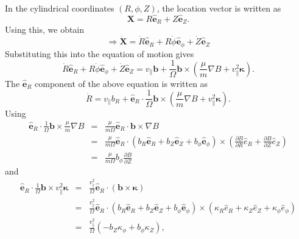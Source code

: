 \documentclass{article}
\begin{document}
In the cylindrical coordinates $(R, \phi, Z)$, the location vector is written
as
\begin{equation}
  \mathbf{X}= R \hat{\mathbf{e}}_R + Z \hat{\mathbf{e}}_Z .
\end{equation}
Using this, we obtain
\begin{equation}
  \Rightarrow \dot{\mathbf{X}} = \dot{R} \hat{\mathbf{e}}_R + R \dot{\phi}
  \hat{\mathbf{e}}_{\phi} + \dot{Z} \hat{\mathbf{e}}_Z
\end{equation}
Substituting this into the equation of motion gives
\begin{equation}
  \label{11-17-2} \dot{R} \hat{\mathbf{e}}_R + R \dot{\phi}
  \hat{\mathbf{e}}_{\phi} + \dot{Z} \hat{\mathbf{e}}_Z = v_{\parallel}
  \mathbf{b}+ \frac{1}{\Omega} \mathbf{b} \times \left( \frac{\mu}{m} \nabla B
  + v_{\parallel}^2 \mathbf{\kappa} \right) .
\end{equation}
The $\hat{\mathbf{e}}_R$ component of the above equation is written as
\begin{equation}
  \label{11-17-1} \dot{R} = v_{\parallel} b_R + \hat{\mathbf{e}}_R \cdot
  \frac{1}{\Omega} \mathbf{b} \times \left( \frac{\mu}{m} \nabla B +
  v_{\parallel}^2 \mathbf{\kappa} \right) .
\end{equation}
Using
\begin{eqnarray}
  \hat{\mathbf{e}}_R \cdot \frac{1}{\Omega} \mathbf{b} \times \frac{\mu}{m}
  \nabla B & = & \frac{\mu}{m \Omega} \hat{\mathbf{e}}_R \cdot \mathbf{b}
  \times \nabla B \nonumber\\
  & = & \frac{\mu}{m \Omega} \hat{\mathbf{e}}_R \cdot (b_R \hat{\mathbf{e}}_R
  + b_Z \hat{\mathbf{e}}_Z + b_{\phi} \hat{\mathbf{e}}_{\phi}) \times \left(
  \frac{\partial B}{\partial R} \hat{e}_R + \frac{\partial B}{\partial Z}
  \hat{e}_Z \right) \nonumber\\
  & = & \frac{\mu}{m \Omega} b_{\phi}  \frac{\partial B}{\partial Z} 
\end{eqnarray}
and
\begin{eqnarray}
  \hat{\mathbf{e}}_R \cdot \frac{1}{\Omega} \mathbf{b} \times v_{\parallel}^2
  \mathbf{\kappa} & = & \frac{v_{\parallel}^2}{\Omega} \hat{\mathbf{e}}_R
  \cdot (\mathbf{b} \times \mathbf{\kappa}) \nonumber\\
  & = & \frac{v_{\parallel}^2}{\Omega} \hat{\mathbf{e}}_R \cdot (b_R
  \hat{\mathbf{e}}_R + b_Z \hat{\mathbf{e}}_Z + b_{\phi}
  \hat{\mathbf{e}}_{\phi}) \times (\kappa_R \hat{e}_R + \kappa_Z \hat{e}_Z +
  \kappa_{\phi} \hat{e}_{\phi}) \nonumber\\
  & = & \frac{v_{\parallel}^2}{\Omega} (- b_Z \kappa_{\phi} + b_{\phi}
  \kappa_Z), 
\end{eqnarray}
\end{document}
